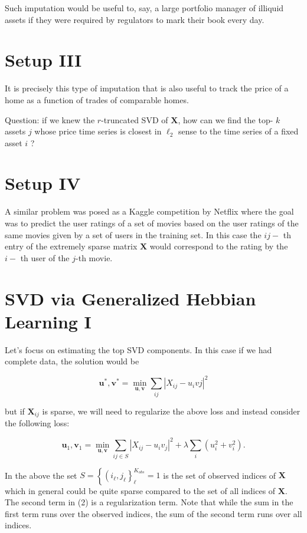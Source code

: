 \documentclass[11pt]{article}
\theoremstyle{plain} %
\theoremstyle{remark}
\begin{document}
Such imputation would be useful to, say, a large portfolio manager of illiquid assets if they were required by regulators to mark their book every day.

\section*{Setup III}
It is precisely this type of imputation that is also useful to track the price of a home as a function of trades of comparable homes.

Question: if we knew the $r$-truncated SVD of $\mathbf{X}$, how can we find the top- $k$ assets $j$ whose price time series is closest in $\ell_{2}$ sense to the time series of a fixed asset $i$ ?

\section*{Setup IV}
A similar problem was posed as a Kaggle competition by Netflix where the goal was to predict the user ratings of a set of movies based on the user ratings of the same movies given by a set of users in the training set. In this case the $i j-$ th entry of the extremely sparse matrix $\mathbf{X}$ would correspond to the rating by the $i-$ th user of the $j$-th movie.

\section*{SVD via Generalized Hebbian Learning I}
Let's focus on estimating the top SVD components. In this case if we had complete data, the solution would be

$$
\mathbf{u}^{*}, \mathbf{v}^{*}=\min _{\mathbf{u}, \mathbf{v}} \sum_{i j}\left|X_{i j}-u_{i} v j\right|^{2}
$$

but if $\mathbf{X}_{i j}$ is sparse, we will need to regularize the above loss and instead consider the following loss:

$$
\mathbf{u}_{1}, \mathbf{v}_{1}=\min _{\mathbf{u}, \mathbf{v}} \sum_{i j \in S}\left|X_{i j}-u_{i} v_{j}\right|^{2}+\lambda \sum_{i}\left(u_{i}^{2}+v_{i}^{2}\right) .
$$

In the above the set $S=\left\{\left(i_{\ell}, j_{\ell}\right\}_{\ell}^{K_{o b s}}=1\right.$ is the set of observed indices of $\mathbf{X}$ which in general could be quite sparse compared to the set of all indices of $\mathbf{X}$. The second term in (2) is a regularization term. Note that while the sum in the first term runs over the observed indices, the sum of the second term runs over all indices.
\end{document}
